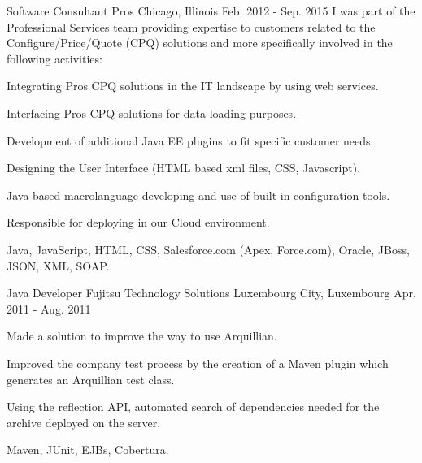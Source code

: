 \begin{cventries}
  \cventryfive
    {Software Consultant} %
    {Pros} %
    {Chicago, Illinois} %
    {Feb. 2012 - Sep. 2015} %
    {I was part of the Professional Services team providing expertise to customers related to the
Configure/Price/Quote (CPQ) solutions and more specifically involved in the following activities:}
    {
      \begin{cvitems} %
        	\item Integrating Pros CPQ solutions in the IT landscape by using web services.
		\item Interfacing Pros CPQ solutions for data loading purposes.
		\item Development of additional Java EE plugins to fit specific customer needs.
    		\item Designing the User Interface (HTML based xml files, CSS, Javascript).
    		\item Java-based macrolanguage developing and use of built-in configuration tools.
    		\item Responsible for deploying in our Cloud environment.
      \end{cvitems}
    }
    {Java, JavaScript, HTML, CSS, Salesforce.com (Apex, Force.com), Oracle, JBoss, JSON, XML, SOAP.}
  
  \cventry
    {Java Developer} %
    {Fujitsu Technology Solutions} %
    {Luxembourg City, Luxembourg} %
    {Apr. 2011 - Aug. 2011} %
    {
      \begin{cvitems} %
        	\item Made a solution to improve the way to use Arquillian.
		\item Improved the company test process by the creation of a Maven plugin which generates an Arquillian test class.
		\item Using the reflection API, automated search of dependencies needed for the archive deployed on the server.
      \end{cvitems}
    }
    {Maven, JUnit, EJBs, Cobertura.}

\end{cventries}
